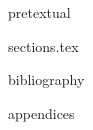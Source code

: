\documentclass[11pt]{article}
\begin{document}
{pretextual}

{sections.tex}

{bibliography}

\clearpage

{appendices}
\end{document}
